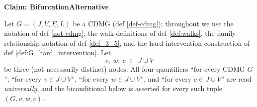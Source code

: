 \noindent\textbf{Claim: BifurcationAlternative}\par\smallskip
{\appendixTexSize
\def\rowref{claim\_3\_5}
\label{claim_3_5}

%
%

\begin{Prp}[BifurcationAlternative]\label{prp:bifurcations_alternative}
    Let $G = (J, V, E, L)$ be a CDMG (def \ref{def-cdmg}); throughout we
    use the notation of def \ref{not-cdmg}, the walk definitions of def
    \ref{def:walks}, the family-relationship notation of def
    \ref{def_3_5}, and the hard-intervention construction of def
    \ref{def:G_hard_intervention}. Let
    \[ v,\ w,\ c \;\in\; J \cup V \]
    be three (not necessarily distinct) nodes. All four quantifiers
    ``for every CDMG $G$'', ``for every $v \in J \cup V$'', ``for every
    $w \in J \cup V$'', and ``for every $c \in J \cup V$'' are read
    \emph{universally}, and the biconditional below is asserted for every
    such tuple $(G, v, w, c)$.


\end{Prp}}

